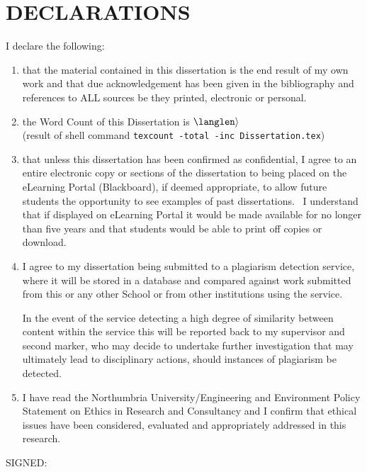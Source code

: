 
\chapter{DECLARATIONS}

I declare the following:

\begin{enumerate}

\item that the material contained in this dissertation is the end result of my own work and that due acknowledgement has been given in the bibliography and references to ALL sources be they printed, electronic or personal.

\item the Word Count of this Dissertation is $\langlen\rangle$\\
(result of shell command \texttt{texcount -total -inc Dissertation.tex})

\item that unless this dissertation has been confirmed as confidential, I agree to an entire electronic copy or sections of the dissertation to being placed on the eLearning Portal (Blackboard), if deemed appropriate, to allow future students the opportunity to see examples of past dissertations.  I understand that if displayed on eLearning Portal it would be made available for no longer than five years and that students would be able to print off copies or download. 

\item I agree to my dissertation being submitted to a plagiarism detection service, where it will be stored in a database and compared against work submitted from this or any other School or from other institutions using the service. 

In the event of the service detecting a high degree of similarity between content within the service this will be reported back to my supervisor and second marker, who may decide to undertake further investigation that may ultimately lead to disciplinary actions, should instances of plagiarism be detected.

\item I have read the Northumbria University/Engineering and Environment Policy Statement on Ethics in Research and Consultancy and I confirm that ethical issues have been considered, evaluated and appropriately addressed in this research.
\end{enumerate}
\vspace{1in}
\large{SIGNED:\dotfill}
